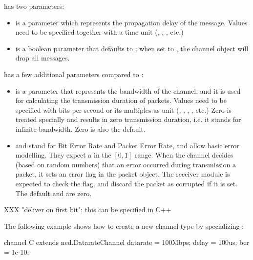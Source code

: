  has two parameters:

\begin{itemize}
    \item {} is a  parameter which represents the
          propagation delay of the message. Values need to be specified
          together with a time unit (, , , etc.)
    \item {} is a boolean parameter that defaults to ;
          when set to , the channel object will drop all messages.
\end{itemize}

 has a few additional parameters compared to :

\begin{itemize}
    \item {} is a  parameter that represents the
          bandwidth of the channel, and it is used for calculating the
          transmission duration of packets. Values need to be specified
          with bits per second or its multiples as unit (,
          , , , etc.) Zero is treated
          specially and results in zero transmission duration, i.e.
          it stands for infinite bandwidth. Zero is also the default.
    \item {} and  stand for Bit Error Rate and Packet Error Rate,
          and allow basic error modelling. They expect a 
          in the $[0,1]$ range. When the channel decides (based on random
          numbers) that an error occurred during transmission a packet,
          it sets an error flag in the packet object. The receiver
          module is expected to check the flag, and discard the packet
          as corrupted if it is set. The default  and 
          are zero.
\end{itemize}

\begin{note}
    XXX "deliver on first bit": this can be specified in C++
\end{note}

The following example shows how to create a new channel type by
specializing :

\begin{ned}
channel C extends ned.DatarateChannel
{
    datarate = 100Mbps;
    delay = 100us;
    ber = 1e-10;
}
\end{ned}

